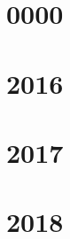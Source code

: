 \documentclass{article}
\begin{document}
	\graphicspath{ {../plots/2016/} }
	\section*{0000}
		
	\section*{2016}

	\section*{2017}

	\section*{2018}
\end{document}
